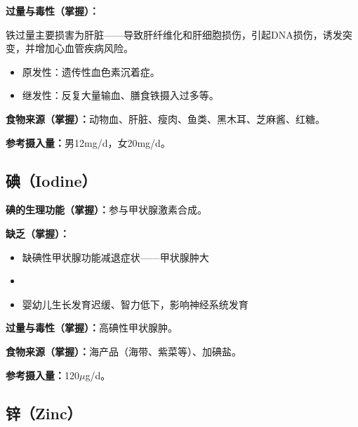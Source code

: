 \begin{keybox}
\difficulty \textbf{过量与毒性（掌握）：}

铁过量主要损害为肝脏——导致肝纤维化和肝细胞损伤，引起DNA损伤，诱发突变，并增加心血管疾病风险。
\begin{itemize}[leftmargin=*]
    \item 原发性：遗传性血色素沉着症。
    \item 继发性：反复大量输血、膳食铁摄入过多等。
\end{itemize}

\textbf{食物来源（掌握）：}动物血、肝脏、瘦肉、鱼类、黑木耳、芝麻酱、红糖。

\textbf{参考摄入量：}男12mg/d，女20mg/d。
\end{keybox}

\subsection{碘（Iodine）}

\begin{keybox}
\textbf{碘的生理功能（掌握）：}参与甲状腺激素合成。

\difficulty \textbf{缺乏（掌握）：}
\begin{itemize}[leftmargin=*]
    \item 缺碘性甲状腺功能减退症状——甲状腺肿大
    \item {}
    \item {}婴幼儿生长发育迟缓、智力低下，影响神经系统发育
\end{itemize}

\difficulty \textbf{过量与毒性（掌握）：}高碘性甲状腺肿。


\textbf{食物来源（掌握）：}海产品（海带、紫菜等）、加碘盐。

\textbf{参考摄入量：}120$\mu$g/d。
\end{keybox}

\subsection{锌（Zinc）}


